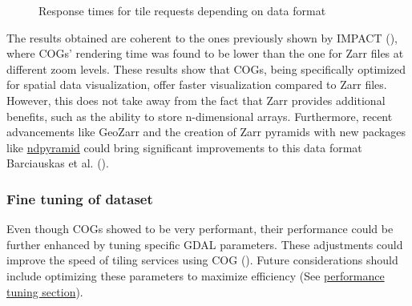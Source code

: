 \documentclass[
  oneside,
  open=any]{scrbook}
\begin{document}
\begin{figure}[H]


\caption{\label{fig-format-comp}Response times for tile requests
depending on data format}

\end{figure}%

The results obtained are coherent to the ones previously shown by IMPACT
(), where COGs' rendering time
was found to be lower than the one for Zarr files at different zoom
levels. These results show that COGs, being specifically optimized for
spatial data visualization, offer faster visualization compared to Zarr
files. However, this does not take away from the fact that Zarr provides
additional benefits, such as the ability to store n-dimensional arrays.
Furthermore, recent advancements like GeoZarr and the creation of Zarr
pyramids with new packages like
\href{https://github.com/carbonplan/ndpyramid}{ndpyramid} could bring
significant improvements to this data format Barciauskas et al.
().

\subsubsection*{Fine tuning of dataset}\label{fine-tuning-of-dataset}

Even though COGs showed to be very performant, their performance could
be further enhanced by tuning specific GDAL parameters. These
adjustments could improve the speed of tiling services using COG
(). Future
considerations should include optimizing these parameters to maximize
efficiency (See
\href{https://developmentseed.org/titiler/advanced/performance_tuning/}{performance
tuning section}).
\end{document}
